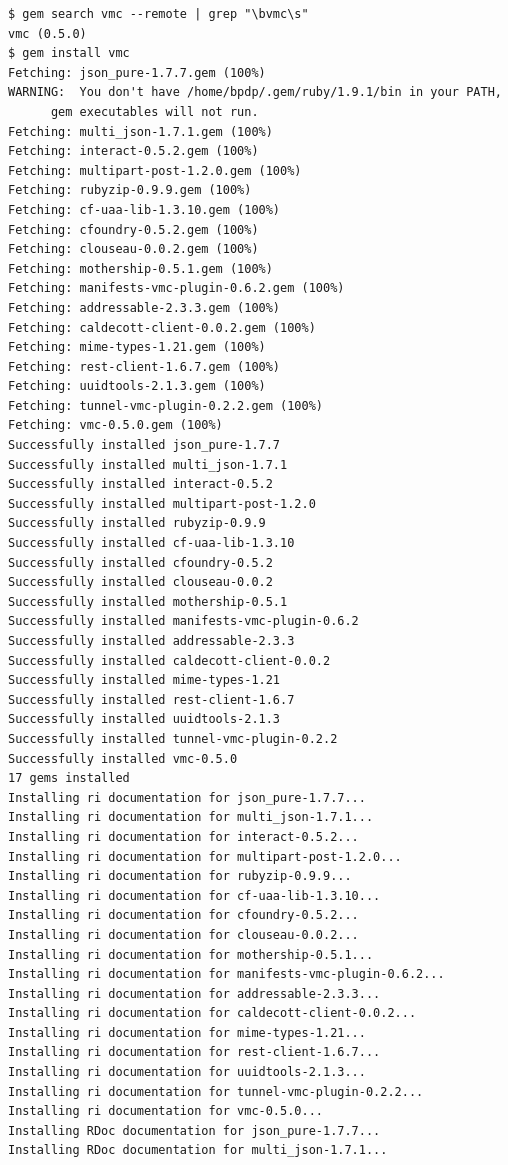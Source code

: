 \lstset{language=bash,caption=Instalasi vmc}
\begin{lstlisting}
$ gem search vmc --remote | grep "\bvmc\s" 
vmc (0.5.0) 
$ gem install vmc 
Fetching: json_pure-1.7.7.gem (100%)
WARNING:  You don't have /home/bpdp/.gem/ruby/1.9.1/bin in your PATH,
	  gem executables will not run.
Fetching: multi_json-1.7.1.gem (100%)
Fetching: interact-0.5.2.gem (100%)
Fetching: multipart-post-1.2.0.gem (100%)
Fetching: rubyzip-0.9.9.gem (100%)
Fetching: cf-uaa-lib-1.3.10.gem (100%)
Fetching: cfoundry-0.5.2.gem (100%)
Fetching: clouseau-0.0.2.gem (100%)
Fetching: mothership-0.5.1.gem (100%)
Fetching: manifests-vmc-plugin-0.6.2.gem (100%)
Fetching: addressable-2.3.3.gem (100%)
Fetching: caldecott-client-0.0.2.gem (100%)
Fetching: mime-types-1.21.gem (100%)
Fetching: rest-client-1.6.7.gem (100%)
Fetching: uuidtools-2.1.3.gem (100%)
Fetching: tunnel-vmc-plugin-0.2.2.gem (100%)
Fetching: vmc-0.5.0.gem (100%)
Successfully installed json_pure-1.7.7
Successfully installed multi_json-1.7.1
Successfully installed interact-0.5.2
Successfully installed multipart-post-1.2.0
Successfully installed rubyzip-0.9.9
Successfully installed cf-uaa-lib-1.3.10
Successfully installed cfoundry-0.5.2
Successfully installed clouseau-0.0.2
Successfully installed mothership-0.5.1
Successfully installed manifests-vmc-plugin-0.6.2
Successfully installed addressable-2.3.3
Successfully installed caldecott-client-0.0.2
Successfully installed mime-types-1.21
Successfully installed rest-client-1.6.7
Successfully installed uuidtools-2.1.3
Successfully installed tunnel-vmc-plugin-0.2.2
Successfully installed vmc-0.5.0
17 gems installed
Installing ri documentation for json_pure-1.7.7...
Installing ri documentation for multi_json-1.7.1...
Installing ri documentation for interact-0.5.2...
Installing ri documentation for multipart-post-1.2.0...
Installing ri documentation for rubyzip-0.9.9...
Installing ri documentation for cf-uaa-lib-1.3.10...
Installing ri documentation for cfoundry-0.5.2...
Installing ri documentation for clouseau-0.0.2...
Installing ri documentation for mothership-0.5.1...
Installing ri documentation for manifests-vmc-plugin-0.6.2...
Installing ri documentation for addressable-2.3.3...
Installing ri documentation for caldecott-client-0.0.2...
Installing ri documentation for mime-types-1.21...
Installing ri documentation for rest-client-1.6.7...
Installing ri documentation for uuidtools-2.1.3...
Installing ri documentation for tunnel-vmc-plugin-0.2.2...
Installing ri documentation for vmc-0.5.0...
Installing RDoc documentation for json_pure-1.7.7...
Installing RDoc documentation for multi_json-1.7.1...

\end{lstlisting}
